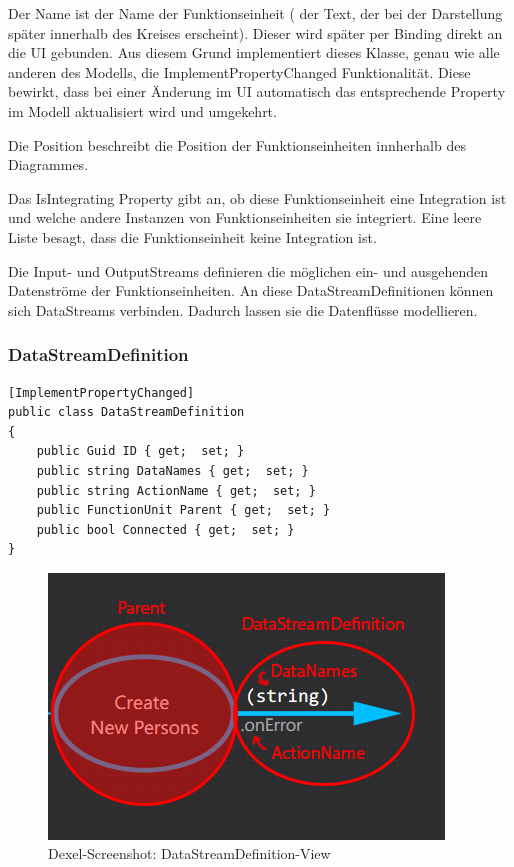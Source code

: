Der Name ist der Name der Funktionseinheit ( der Text, der bei der
Darstellung später innerhalb des Kreises erscheint). Dieser wird später per Binding
direkt an die UI gebunden. Aus diesem Grund implementiert dieses Klasse,
genau wie alle anderen des Modells, die ImplementPropertyChanged
Funktionalität. Diese bewirkt, dass bei einer Änderung im UI automatisch das
entsprechende Property im Modell aktualisiert wird und umgekehrt.

Die Position beschreibt die Position der Funktionseinheiten innherhalb des
Diagrammes.  

Das IsIntegrating Property gibt an, ob diese Funktionseinheit eine Integration
ist und welche andere Instanzen von Funktionseinheiten sie integriert.
Eine leere Liste besagt, dass die Funktionseinheit keine Integration ist.

Die Input- und OutputStreams definieren die möglichen ein- und ausgehenden
Datenströme der Funktionseinheiten. An diese DataStreamDefinitionen können sich DataStreams
verbinden. Dadurch lassen sie die Datenflüsse modellieren.


	\subsubsection{DataStreamDefinition}
	
	\begin{lstlisting}[caption=DataStreamDefinition Klasse]
[ImplementPropertyChanged]
public class DataStreamDefinition
{
	public Guid ID { get;  set; }
	public string DataNames { get;  set; }
	public string ActionName { get;  set; }
	public FunctionUnit Parent { get;  set; }
	public bool Connected { get;  set; }
}
	\end{lstlisting}
	
		
		\begin{figure}[H]
			\centering
			\includegraphics[width=0.6\linewidth]{./img/DataStreamDefinitionView.png} 
			\caption{Dexel-Screenshot: DataStreamDefinition-View}
		\end{figure}
	
